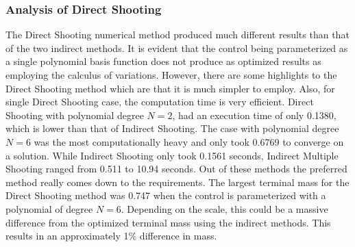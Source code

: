 \documentclass[]{article}
\begin{document}
\subsubsection{Analysis of Direct Shooting}
The Direct Shooting numerical method produced much different results than that of the two indirect methods. It is evident that the control being parameterized as a single polynomial basis function does not produce as optimized results as employing the calculus of variations. However, there are some highlights to the Direct Shooting method which are that it is much simpler to employ. Also, for single Direct Shooting case, the computation time is very efficient. Direct Shooting with polynomial degree \(N = 2\), had an execution time of only 0.1380, which is lower than that of Indirect Shooting. The case with polynomial degree \(N = 6\) was the most computationally heavy and only took 0.6769 to converge on a solution. While Indirect Shooting only took 0.1561 seconds, Indirect Multiple Shooting ranged from 0.511 to 10.94 seconds. Out of these methods the preferred method really comes down to the requirements. The largest terminal mass for the Direct Shooting method was 0.747 when the control is parameterized with a polynomial of degree \(N = 6\). Depending on the scale, this could be a massive difference from the optimized terminal mass using the indirect methods. This results in an approximately 1\% difference in mass. 
\FloatBarrier
\end{document}
